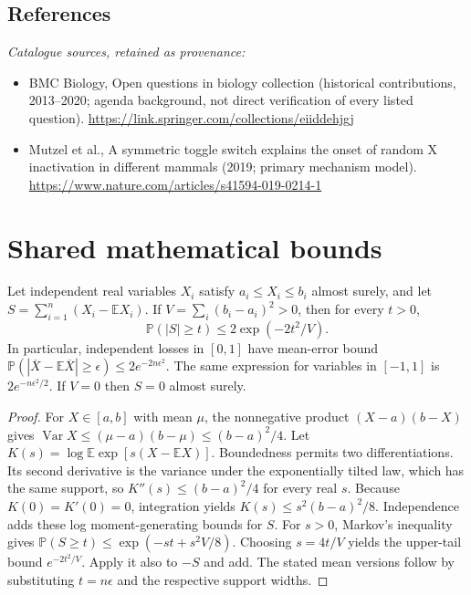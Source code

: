 \documentclass[11pt]{article}
\begin{document}
\subsection{References}
\noindent\emph{Catalogue sources, retained as provenance:}
\begin{itemize}
\item BMC Biology, Open questions in biology collection (historical contributions, 2013--2020; agenda background, not direct verification of every listed question). \url{https://link.springer.com/collections/eiiddehjgj}
\item Mutzel et al., A symmetric toggle switch explains the onset of random X inactivation in different mammals (2019; primary mechanism model). \url{https://www.nature.com/articles/s41594-019-0214-1}
\end{itemize}




\section{Shared mathematical bounds}\label{app:bounds}
\begin{lemma}\label{lem:bounded}
Let independent real variables $X_i$ satisfy $a_i\leq X_i\leq b_i$ almost surely,
and let $S=\sum_{i=1}^n(X_i-\mathbb{E} X_i)$. If
$V=\sum_i(b_i-a_i)^2>0$, then for every $t>0$,
\[
 \mathbb{P}(|S|\geq t)\leq 2\exp(-2t^2/V).
\]
In particular, independent losses in $[0,1]$ have mean-error bound
$\mathbb{P}(|\overline X-\mathbb{E}\overline X|\geq\epsilon)
\leq2e^{-2n\epsilon^2}$. The same expression for variables in $[-1,1]$
is $2e^{-n\epsilon^2/2}$. If $V=0$ then $S=0$ almost surely.
\end{lemma}
\begin{proof}
For $X\in[a,b]$ with mean $\mu$, the nonnegative product
$(X-a)(b-X)$ gives
$\operatorname{Var} X\leq(\mu-a)(b-\mu)\leq(b-a)^2/4$.
Let $K(s)=\log\mathbb{E}\exp[s(X-\mathbb{E} X)]$.
Boundedness permits two differentiations. Its second derivative is the variance
under the exponentially tilted law, which has the same support, so
$K''(s)\leq(b-a)^2/4$ for every real $s$.
Because $K(0)=K'(0)=0$, integration yields
$K(s)\leq s^2(b-a)^2/8$.
Independence adds these log moment-generating bounds for $S$.
For $s>0$, Markov's inequality gives
$\mathbb{P}(S\geq t)\leq\exp(-st+s^2V/8)$.
Choosing $s=4t/V$ yields the upper-tail bound $e^{-2t^2/V}$.
Apply it also to $-S$ and add. The stated mean versions follow by substituting
$t=n\epsilon$ and the respective support widths.
\end{proof}
\end{document}
